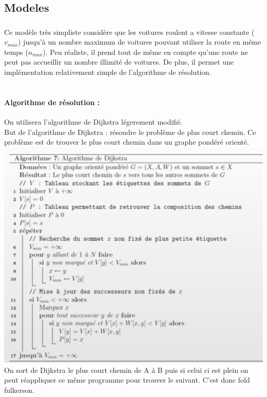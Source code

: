 \documentclass{article}
\newcommand {\axes}[4] {\draw[->] (0,0) -- (#3,0) node [right]{#1};\draw[->] (0,0) -- (0,#4) node[above]{#2};}
\newcommand {\valx}[2] {\draw (#1,0.03) -- (#1,-0.03) node[anchor=north]{#2};}
\newcommand {\valy}[2] {\draw (0.03,#1) -- (-0.03,#1) node[anchor=east]{#2};}
\begin{document}
\subsection{Modeles}
\subsubsection{}

Ce modèle très simpliste considère que les voitures roulent a vitesse constante ($v_{max}$) jusqu’à un nombre maximum de voitures pouvant utiliser la route en même temps ($n_{max}$). Peu réaliste, il prend tout de même en compte qu’une route ne peut pas accueillir un nombre illimité de voitures. De plus, il permet une implémentation relativement simple de l’algorithme de résolution.
\\\\
\paragraph {Algorithme de résolution : }
On utilisera l'algorithme de Dijkstra l\'egerement modifi\'e.\\
But de l'algorithme de Dijkstra : r\'esoudre le probl\`eme de plus court chemin. Ce probl\`eme est de trouver le plus court chemin dans un graphe pond\'er\'e orient\'e. \\\includegraphics[scale=0.2]{dijkstra-explication.png}
On sort de Dijkstra le plus court chemin de A \'a B puis si celui ci est plein on peut r\'eappliquer ce m\^eme programme pour trouver le suivant. C'est donc fold fulkerson.
\end{document}
